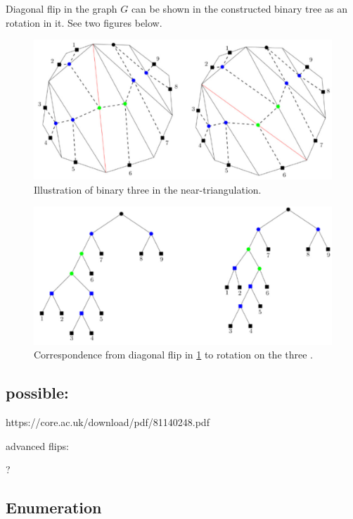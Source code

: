 Diagonal flip in the graph $G$ can be shown in the constructed binary tree as an rotation in it. See two figures below.

\begin{figure}[H]

    \includegraphics[width=\textwidth]{images/treeInGraph.PNG}
    \caption{Illustration of binary three in the near-triangulation.\label{fig:treeInGraph}}
\end{figure}

\begin{figure}[H]
    \includegraphics[width=\textwidth]{images/treeFlip.PNG} 
    \caption{Correspondence from diagonal flip in \ref{fig:treeInGraph} to rotation on the three .}
\end{figure}

\subsection{possible:}

https://core.ac.uk/download/pdf/81140248.pdf

advanced flips:

\textcite{matsumatoFlips}?

\subsection{Enumeration}

